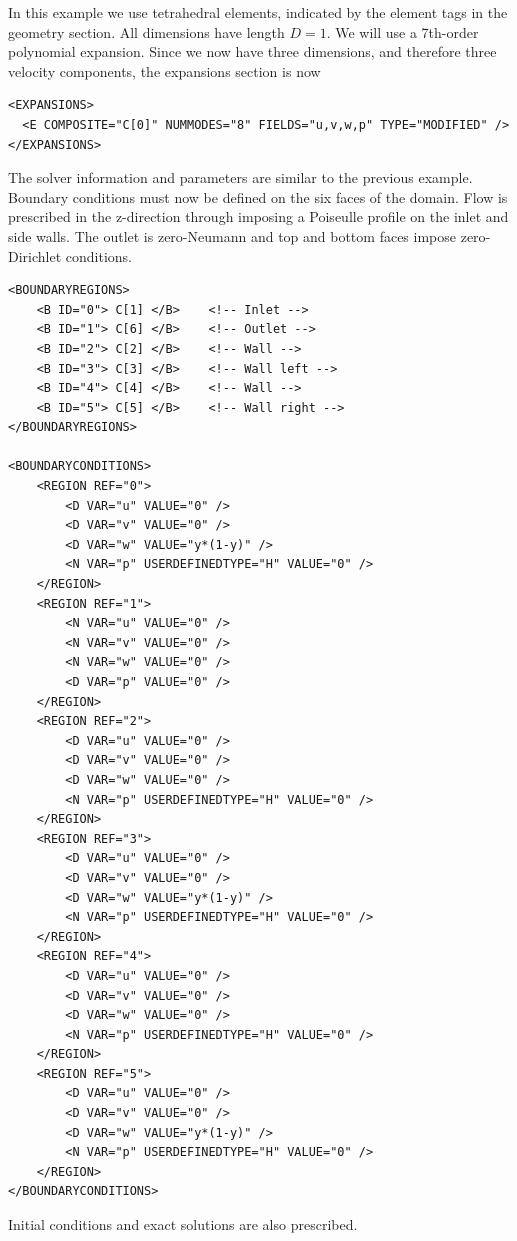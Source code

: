 In this example we use tetrahedral elements, indicated by the  element
tags in the geometry section. All dimensions have length $D=1$. We will use a
7th-order polynomial expansion. Since we now have three dimensions, and
therefore three velocity components, the expansions section is now
\begin{lstlisting}[style=XMLStyle]
<EXPANSIONS>
  <E COMPOSITE="C[0]" NUMMODES="8" FIELDS="u,v,w,p" TYPE="MODIFIED" />
</EXPANSIONS>
\end{lstlisting}
The solver information and parameters are similar to the previous example.
Boundary conditions must now be defined on the six faces of the domain. Flow is
prescribed in the z-direction through imposing a Poiseulle profile on the inlet
and side walls. The outlet is zero-Neumann and top and bottom faces impose
zero-Dirichlet conditions.
\begin{lstlisting}[style=XMLStyle]
<BOUNDARYREGIONS>
    <B ID="0"> C[1] </B>    <!-- Inlet -->
    <B ID="1"> C[6] </B>    <!-- Outlet -->
    <B ID="2"> C[2] </B>    <!-- Wall -->
    <B ID="3"> C[3] </B>    <!-- Wall left -->
    <B ID="4"> C[4] </B>    <!-- Wall -->
    <B ID="5"> C[5] </B>    <!-- Wall right -->
</BOUNDARYREGIONS>

<BOUNDARYCONDITIONS>
    <REGION REF="0">
        <D VAR="u" VALUE="0" />
        <D VAR="v" VALUE="0" />
        <D VAR="w" VALUE="y*(1-y)" />
        <N VAR="p" USERDEFINEDTYPE="H" VALUE="0" />
    </REGION>
    <REGION REF="1">
        <N VAR="u" VALUE="0" />
        <N VAR="v" VALUE="0" />
        <N VAR="w" VALUE="0" />
        <D VAR="p" VALUE="0" />
    </REGION>
    <REGION REF="2">
        <D VAR="u" VALUE="0" />
        <D VAR="v" VALUE="0" />
        <D VAR="w" VALUE="0" />
        <N VAR="p" USERDEFINEDTYPE="H" VALUE="0" />
    </REGION>
    <REGION REF="3">
        <D VAR="u" VALUE="0" />
        <D VAR="v" VALUE="0" />
        <D VAR="w" VALUE="y*(1-y)" />
        <N VAR="p" USERDEFINEDTYPE="H" VALUE="0" />
    </REGION>
    <REGION REF="4">
        <D VAR="u" VALUE="0" />
        <D VAR="v" VALUE="0" />
        <D VAR="w" VALUE="0" />
        <N VAR="p" USERDEFINEDTYPE="H" VALUE="0" />
    </REGION>
    <REGION REF="5">
        <D VAR="u" VALUE="0" />
        <D VAR="v" VALUE="0" />
        <D VAR="w" VALUE="y*(1-y)" />
        <N VAR="p" USERDEFINEDTYPE="H" VALUE="0" />
    </REGION>
</BOUNDARYCONDITIONS>
\end{lstlisting}

Initial conditions and exact solutions are also prescribed.

